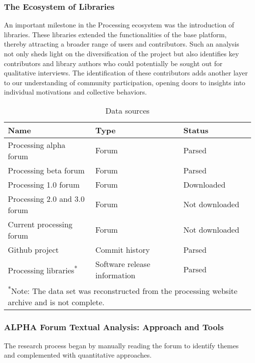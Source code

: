 \documentclass{article}
\begin{document}
\subsubsection*{The Ecosystem of Libraries}
An important milestone in the Processing ecosystem was the introduction of libraries. These libraries extended the functionalities of the base platform, thereby attracting a broader range of users and contributors. Such an analysis not only sheds light on the diversification of the project but also identifies key contributors and library authors who could potentially be sought out for qualitative interviews. The identification of these contributors adds another layer to our understanding of community participation, opening doors to insights into individual motivations and collective behaviors.

\begin{table}[h]
  \raggedright
  \caption{Data sources}
  \label{table:data-sources}
  \begin{tabular}{l l l c}
      \toprule
      Name & Type & Status \\
      \midrule
      Processing alpha forum & Forum & Parsed \\
      Processing beta forum & Forum & Parsed  \\
      Processing 1.0 forum & Forum & Downloaded \\
      Processing 2.0 and 3.0 forum & Forum  & Not downloaded \\
      Current processing forum & Forum & Not downloaded\\
      Github project & Commit history & Parsed \\
      Processing libraries\textsuperscript{*} & Software release information & Parsed \\
      \bottomrule
      \multicolumn{3}{l}{\footnotesize \textsuperscript{*}Note: The data set was reconstructed from the processing website archive and is not complete.}
  \end{tabular}
\end{table}


\subsubsection{ALPHA Forum Textual Analysis: Approach and Tools}
The research process began by manually reading the forum to identify themes and complemented with quantitative approaches. 


\end{document}
